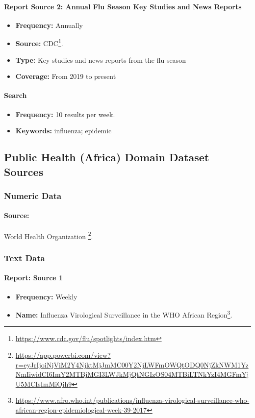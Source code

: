 \paragraph{Report Source 2: Annual Flu Season Key Studies and News Reports}
\begin{itemize}
    \item \textbf{Frequency:} Annually
    \item \textbf{Source:} CDC\footnote{\url{https://www.cdc.gov/flu/spotlights/index.htm}}.
    \item \textbf{Type:} Key studies and news reports from the flu season
    \item \textbf{Coverage:} From 2019 to present
\end{itemize}
\paragraph{Search}
\begin{itemize}
    \item \textbf{Frequency:} 10 results per week.
    \item \textbf{Keywords:} influenza; epidemic
\end{itemize}

\subsection{Public Health (Africa)  Domain Dataset Sources}


\subsubsection{Numeric Data}
\paragraph{Source:} World Health Organization \footnote{\url{https://app.powerbi.com/view?r=eyJrIjoiNjViM2Y4NjktMjJmMC00Y2NjLWFmOWQtODQ0NjZkNWM1YzNmIiwidCI6ImY2MTBjMGI3LWJkMjQtNGIzOS04MTBiLTNkYzI4MGFmYjU5MCIsImMiOjh9}}.

\subsubsection{Text Data}
\paragraph{Report: Source 1}
\begin{itemize}
    \item \textbf{Frequency:} Weekly
    \item \textbf{Name:} Influenza Virological Surveillance in the WHO African Region\footnote{\href{https://www.afro.who.int/publications/influenza-virological-surveillance-who-african-region-epidemiological-week-39-2017}{https://www.afro.who.int/publications/influenza-virological-surveillance-who-african-region-epidemiological-week-39-2017}}.
\end{itemize}
